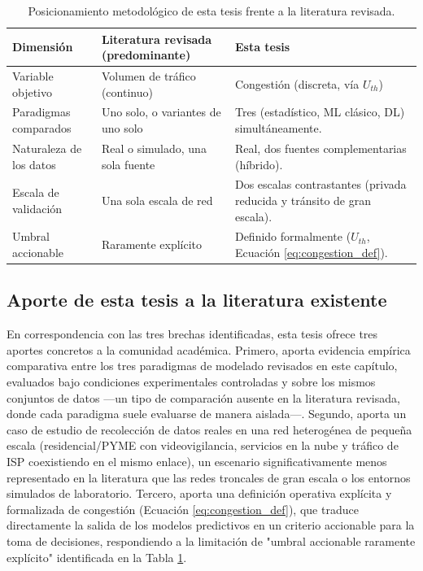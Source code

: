 \documentclass[12pt]{report}
\begin{document}
\begin{table}[H]
    \centering
    \begin{tabular}{|p{4.5cm}|p{4cm}|p{4cm}|}
        \hline
        \textbf{Dimensión} & \textbf{Literatura revisada (predominante)} & \textbf{Esta tesis} \\
        \hline
        Variable objetivo & Volumen de tráfico (continuo) & Congestión (discreta, vía $U_{th}$) \\
        \hline
        Paradigmas comparados & Uno solo, o variantes de uno solo & Tres (estadístico, ML clásico, DL) simultáneamente. \\
        \hline
        Naturaleza de los datos & Real o simulado, una sola fuente & Real, dos fuentes complementarias (híbrido). \\
        \hline
        Escala de validación & Una sola escala de red & Dos escalas contrastantes (privada reducida y tránsito de gran escala). \\
        \hline
        Umbral accionable & Raramente explícito & Definido formalmente ($U_{th}$, Ecuación \ref{eq:congestion_def}). \\
        \hline
    \end{tabular}
    \caption{Posicionamiento metodológico de esta tesis frente a la literatura revisada.}
    \label{tab:posicionamiento_tesis}
\end{table}

\subsection*{Aporte de esta tesis a la literatura existente}

En correspondencia con las tres brechas identificadas, esta tesis ofrece tres aportes concretos a la comunidad académica. Primero, aporta evidencia empírica comparativa entre los tres paradigmas de modelado revisados en este capítulo, evaluados bajo condiciones experimentales controladas y sobre los mismos conjuntos de datos ---un tipo de comparación ausente en la literatura revisada, donde cada paradigma suele evaluarse de manera aislada---. Segundo, aporta un caso 
de estudio de recolección de datos reales en una red heterogénea de pequeña escala (residencial/PYME con videovigilancia, servicios en la nube y tráfico de ISP coexistiendo en el mismo enlace), un escenario significativamente menos representado en la literatura que las redes troncales de gran escala o los entornos simulados de laboratorio. Tercero, aporta una definición operativa explícita y formalizada de congestión (Ecuación \ref{eq:congestion_def}), que traduce 
directamente la salida de los modelos predictivos en un criterio accionable para la toma de decisiones, respondiendo a la limitación de "umbral accionable raramente explícito" identificada en la Tabla \ref{tab:posicionamiento_tesis}.
\end{document}
